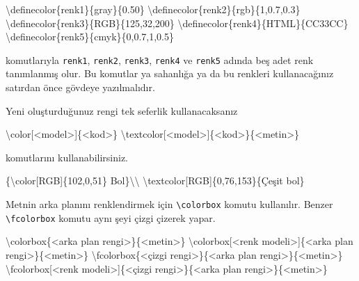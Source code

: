 \documentclass[
  10pt,
]{scrbook}
\newenvironment{Shaded}{\begin{snugshade}}{\end{snugshade}}
\newcommand{\FunctionTok}[1]{\textcolor[rgb]{0.00,0.00,0.00}{#1}}
\newcommand{\NormalTok}[1]{#1}
\theoremstyle{definition}
\theoremstyle{definition}
\theoremstyle{definition}
\theoremstyle{definition}
\theoremstyle{remark}
\begin{document}
\begin{Shaded}
\begin{Highlighting}[]
\FunctionTok{\textbackslash{}definecolor}\NormalTok{\{renk1\}\{gray\}\{0.50\}}
\FunctionTok{\textbackslash{}definecolor}\NormalTok{\{renk2\}\{rgb\}\{1,0.7,0.3\}}
\FunctionTok{\textbackslash{}definecolor}\NormalTok{\{renk3\}\{RGB\}\{125,32,200\}}
\FunctionTok{\textbackslash{}definecolor}\NormalTok{\{renk4\}\{HTML\}\{CC33CC\}}
\FunctionTok{\textbackslash{}definecolor}\NormalTok{\{renk5\}\{cmyk\}\{0,0.7,1,0.5\}}
\end{Highlighting}
\end{Shaded}

komutlarıyla \texttt{renk1}, \texttt{renk2}, \texttt{renk3}, \texttt{renk4} ve \texttt{renk5} adında beş adet renk tanımlanmış olur. Bu komutlar ya sahanlığa ya da bu renkleri kullanacağınız satırdan önce gövdeye yazılmalıdır.

Yeni oluşturduğunuz rengi tek seferlik kullanacaksanız

\begin{Shaded}
\begin{Highlighting}[]
\FunctionTok{\textbackslash{}color}\NormalTok{[\textless{}model\textgreater{}]\{\textless{}kod\textgreater{}\}}
\FunctionTok{\textbackslash{}textcolor}\NormalTok{[\textless{}model\textgreater{}]\{\textless{}kod\textgreater{}\}\{\textless{}metin\textgreater{}\}}
\end{Highlighting}
\end{Shaded}

komutlarını kullanabilirsiniz.

\begin{Shaded}
\begin{Highlighting}[]
\NormalTok{\{}\FunctionTok{\textbackslash{}color}\NormalTok{[RGB]\{102,0,51\} Bol\}}\FunctionTok{\textbackslash{}\textbackslash{}}
\FunctionTok{\textbackslash{}textcolor}\NormalTok{[RGB]\{0,76,153\}\{Çeşit bol\}}
\end{Highlighting}
\end{Shaded}

Metnin arka planını renklendirmek için \texttt{\textbackslash{}colorbox} komutu kullanılır. Benzer \texttt{\textbackslash{}fcolorbox} komutu aynı şeyi çizgi çizerek yapar.

\begin{Shaded}
\begin{Highlighting}[]
\FunctionTok{\textbackslash{}colorbox}\NormalTok{\{\textless{}arka plan rengi\textgreater{}\}\{\textless{}metin\textgreater{}\}}
\FunctionTok{\textbackslash{}colorbox}\NormalTok{[\textless{}renk modeli\textgreater{}]\{\textless{}arka plan rengi\textgreater{}\}\{\textless{}metin\textgreater{}\}}
\FunctionTok{\textbackslash{}fcolorbox}\NormalTok{\{\textless{}çizgi rengi\textgreater{}\}\{\textless{}arka plan rengi\textgreater{}\}\{\textless{}metin\textgreater{}\}}
\FunctionTok{\textbackslash{}fcolorbox}\NormalTok{[\textless{}renk modeli\textgreater{}]\{\textless{}çizgi rengi\textgreater{}\}\{\textless{}arka plan rengi\textgreater{}\}\{\textless{}metin\textgreater{}\}}
\end{Highlighting}
\end{Shaded}
\end{document}
